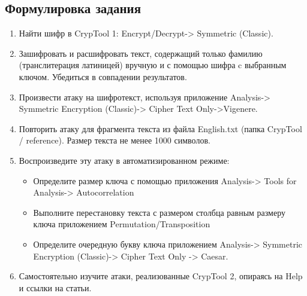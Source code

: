 \documentclass[a4paper, 14pt]{extarticle}
\begin{document}
\subsection{Формулировка задания}
\begin{enumerate}
    \item Найти шифр в CrypTool 1: Encrypt/Decrypt-> Symmetric (Classic).
    \item Зашифровать и расшифровать текст, содержащий только фамилию (транслитерация латиницей) вручную и с помощью шифра c выбранным ключом. Убедиться в совпадении результатов.
    \item Произвести атаку на шифротекст, используя приложение Analysis-> Symmetric Encryption (Classic)-> Cipher Text Only->Vigenere.
    \item Повторить атаку для фрагмента текста из файла English.txt (папка CrypTool / reference). Размер текста не менее 1000 символов.
    \item Воспроизведите эту атаку в автоматизированном режиме: 
    \begin{itemize}
        \item Определите размер ключа с помощью приложения Analysis-> Tools for Analysis-> Autocorrelation
        \item Выполните перестановку текста с размером столбца равным размеру ключа приложением Permutation/Transposition
        \item Определите очередную букву ключа приложением Analysis-> Symmetric Encryption (Classic)-> Cipher Text Only -> Caesar.
    \end{itemize}
    \item Самостоятельно изучите атаки, реализованные CrypTool 2,
опираясь на Help и ссылки на статьи.
\end{enumerate}
\end{document}
